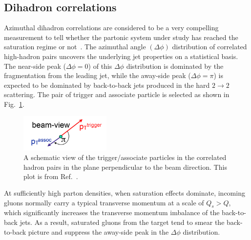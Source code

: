 \subsection{Dihadron correlations}  \label{subsec:dihadron_preintro}

Azimuthal dihadron correlations are considered to be a very compelling
measurement to tell whether the partonic system under study has reached the
saturation regime or not~\cite{Kharzeev:2004bw}. The azimuthal angle
$(\Delta\phi)$ distribution of correlated high-\pt hadron pairs uncovers the
underlying jet properties on a statistical basis. The near-side peak
($\Delta\phi=0$) of this $\Delta\phi$ distribution is dominated by the
fragmentation from the leading jet, while the away-side peak ($\Delta\phi=\pi$)
is expected to be dominated by back-to-back jets produced in the hard
$2\rightarrow2$ scattering. The pair of trigger and associate particle is selected as shown in Fig.~\ref{fig:dihadron_beamView}. 


\begin{figure}
\centering
\includegraphics[width=0.4\textwidth]{plots/chpt3/dihadron_beam_view.png}
\caption[A schematic view of the trigger/associate particles in the correlated hadron pairs in the plane perpendicular to the beam direction]{
A schematic view of the trigger/associate particles in the correlated hadron pairs in the plane perpendicular to the beam direction.
This plot is from Ref.~\cite{Accardi:2012qut}.}
\label{fig:dihadron_beamView}
\end{figure}

At sufficiently high parton densities, when
saturation effects dominate, incoming gluons normally carry a typical transverse
momentum at a scale of $Q_{s}>Q$, which significantly increases the transverse
momentum imbalance of the back-to-back jets. As a result, saturated gluons from
the target tend to smear the back-to-back picture and suppress the away-side
peak in the $\Delta\phi$ distribution.

